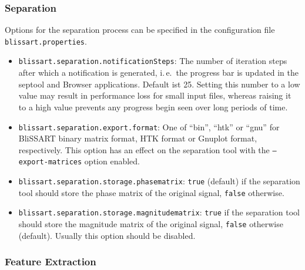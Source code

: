  
\subsubsection{Separation}

Options for the separation process can be specified in the
configuration file {\tt blissart.properties}.

\begin{itemize}
  \item {\tt blissart.separation.notificationSteps}:
        The number of iteration steps after which a notification is generated,
        i.\,e.\ the progress bar is updated in the septool and Browser
        applications. Default ist 25. Setting this number to a low value may
        result in performance loss for small input files, whereas raising it
        to a high value prevents any progress begin seen over long periods of
        time.
  \item {\tt blissart.separation.export.format}:
        One of ``bin'', ``htk'' or ``gnu'' for BliSSART binary matrix format,
        HTK format or Gnuplot format, respectively. This option has an effect
        on the separation tool with the {\tt --export-matrices} option enabled.
  \item {\tt blissart.separation.storage.phasematrix}:
        {\tt true} (default) if the separation tool should store the phase
        matrix of the original signal, {\tt false} otherwise.
  \item {\tt blissart.separation.storage.magnitudematrix}:
        {\tt true} if the separation tool should store the magnitude
        matrix of the original signal, {\tt false} otherwise (default).
        Usually this option should be disabled.
\end{itemize}


\subsubsection{Feature Extraction}
\label{section:ConfigFileFex}

